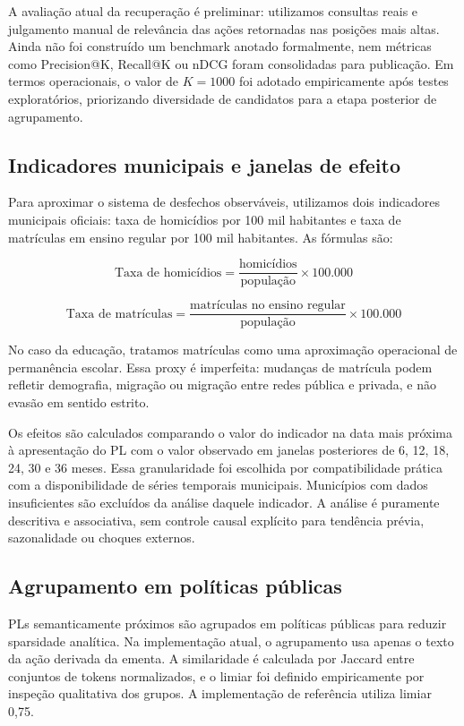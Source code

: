 A avaliação atual da recuperação é preliminar: utilizamos consultas reais e julgamento manual de relevância das ações retornadas nas posições mais altas. Ainda não foi construído um benchmark anotado formalmente, nem métricas como Precision@K, Recall@K ou nDCG foram consolidadas para publicação. Em termos operacionais, o valor de $K = 1000$ foi adotado empiricamente após testes exploratórios, priorizando diversidade de candidatos para a etapa posterior de agrupamento.

\subsection{Indicadores municipais e janelas de efeito}

Para aproximar o sistema de desfechos observáveis, utilizamos dois indicadores municipais oficiais: taxa de homicídios por 100 mil habitantes e taxa de matrículas em ensino regular por 100 mil habitantes. As fórmulas são:

\[
\text{Taxa de homicídios} = \frac{\text{homicídios}}{\text{população}} \times 100.000
\]

\[
\text{Taxa de matrículas} = \frac{\text{matrículas no ensino regular}}{\text{população}} \times 100.000
\]

No caso da educação, tratamos matrículas como uma aproximação operacional de permanência escolar. Essa proxy é imperfeita: mudanças de matrícula podem refletir demografia, migração ou migração entre redes pública e privada, e não evasão em sentido estrito.

Os efeitos são calculados comparando o valor do indicador na data mais próxima à apresentação do PL com o valor observado em janelas posteriores de 6, 12, 18, 24, 30 e 36 meses. Essa granularidade foi escolhida por compatibilidade prática com a disponibilidade de séries temporais municipais. Municípios com dados insuficientes são excluídos da análise daquele indicador. A análise é puramente descritiva e associativa, sem controle causal explícito para tendência prévia, sazonalidade ou choques externos.

\subsection{Agrupamento em políticas públicas}

PLs semanticamente próximos são agrupados em políticas públicas para reduzir sparsidade analítica. Na implementação atual, o agrupamento usa apenas o texto da ação derivada da ementa. A similaridade é calculada por Jaccard entre conjuntos de tokens normalizados, e o limiar foi definido empiricamente por inspeção qualitativa dos grupos. A implementação de referência utiliza limiar 0,75.

